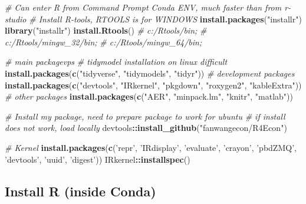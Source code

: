 \documentclass[]{article}
\newenvironment{Shaded}{\begin{snugshade}}{\end{snugshade}}
\newcommand{\CommentTok}[1]{\textcolor[rgb]{0.56,0.35,0.01}{\textit{#1}}}
\newcommand{\KeywordTok}[1]{\textcolor[rgb]{0.13,0.29,0.53}{\textbf{#1}}}
\newcommand{\NormalTok}[1]{#1}
\newcommand{\OperatorTok}[1]{\textcolor[rgb]{0.81,0.36,0.00}{\textbf{#1}}}
\newcommand{\StringTok}[1]{\textcolor[rgb]{0.31,0.60,0.02}{#1}}
\begin{document}
\begin{Shaded}
\begin{Highlighting}[]
\CommentTok{# Can enter R from Command Prompt Conda ENV, much faster than from r-studio}
\CommentTok{# Install R-tools, RTOOLS is for WINDOWS}
\KeywordTok{install.packages}\NormalTok{(}\StringTok{"installr"}\NormalTok{)}
\KeywordTok{library}\NormalTok{(}\StringTok{"installr"}\NormalTok{)}
\KeywordTok{install.Rtools}\NormalTok{()}
\CommentTok{# c:/Rtools/bin;}
\CommentTok{# c:/Rtools/mingw_32/bin;}
\CommentTok{# c:/Rtools/mingw_64/bin;}

\CommentTok{# main packagevps}
\CommentTok{# tidymodel installation on linux difficult}
\KeywordTok{install.packages}\NormalTok{(}\KeywordTok{c}\NormalTok{(}\StringTok{"tidyverse"}\NormalTok{, }\StringTok{"tidymodels"}\NormalTok{, }\StringTok{"tidyr"}\NormalTok{))}
\CommentTok{# development packages}
\KeywordTok{install.packages}\NormalTok{(}\KeywordTok{c}\NormalTok{(}\StringTok{"devtools"}\NormalTok{, }\StringTok{"IRkernel"}\NormalTok{, }\StringTok{"pkgdown"}\NormalTok{, }\StringTok{"roxygen2"}\NormalTok{, }\StringTok{"kableExtra"}\NormalTok{))}
\CommentTok{# other packages}
\KeywordTok{install.packages}\NormalTok{(}\KeywordTok{c}\NormalTok{(}\StringTok{"AER"}\NormalTok{, }\StringTok{"minpack.lm"}\NormalTok{, }\StringTok{"knitr"}\NormalTok{, }\StringTok{"matlab"}\NormalTok{))}

\CommentTok{# Install my package, need to prepare package to work for ubuntu}
\CommentTok{# if install does not work, load locally}
\NormalTok{devtools}\OperatorTok{::}\KeywordTok{install_github}\NormalTok{(}\StringTok{"fanwangecon/R4Econ"}\NormalTok{)}

\CommentTok{# Kernel}
\KeywordTok{install.packages}\NormalTok{(}\KeywordTok{c}\NormalTok{(}\StringTok{'repr'}\NormalTok{, }\StringTok{'IRdisplay'}\NormalTok{, }\StringTok{'evaluate'}\NormalTok{, }\StringTok{'crayon'}\NormalTok{, }\StringTok{'pbdZMQ'}\NormalTok{, }\StringTok{'devtools'}\NormalTok{, }\StringTok{'uuid'}\NormalTok{, }\StringTok{'digest'}\NormalTok{))}
\NormalTok{IRkernel}\OperatorTok{::}\KeywordTok{installspec}\NormalTok{()}
\end{Highlighting}
\end{Shaded}

\hypertarget{install-r-inside-conda}{%
\subsection{Install R (inside Conda)}\label{install-r-inside-conda}}
\end{document}
